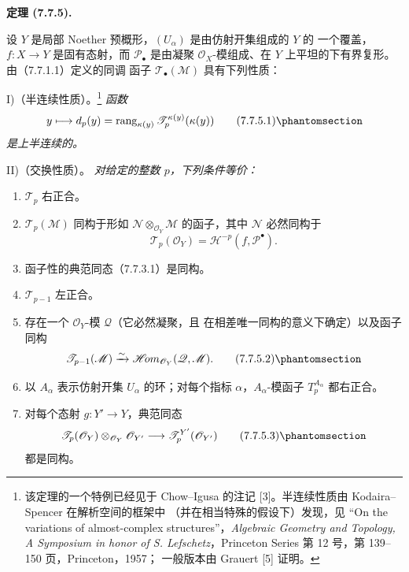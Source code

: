 \documentclass[UTF8,fontset=none,11pt,oneside,openany]{ctexbook}
\newenvironment{theorem}[1][]{%
  \par\medskip\noindent\textbf{定理 (#1).}\ %
}{\par}
\newcommand{\oldpage}[2][]{%
  \hypertarget{ega-source-page-#1-#2}{}%
  \marginnote{\scriptsize\textbf{#1}~|~#2}\ignorespaces}
\let\EGAOriginalLabel\label
\renewcommand{\label}[1]{\phantomsection\EGAOriginalLabel{#1}}
\begin{document}
\begin{theorem}[7.7.5]
设 $Y$ 是局部 Noether 预概形，$(U_\alpha)$ 是由仿射开集组成的 $Y$ 的
一个覆盖，$f:X\to Y$ 是固有态射，而 $\mathscr P_\bullet$ 是由凝聚
$\mathscr O_X$-模组成、在 $Y$ 上平坦的下有界复形。由（7.7.1.1）定义的同调
函子 $\mathscr T_\bullet(\mathscr M)$ 具有下列性质：

\medskip
\noindent
\textnormal{I)（半连续性质）。}\footnote{该定理的一个特例已经见于
Chow--Igusa 的注记 [3]。半连续性质由 Kodaira--Spencer 在解析空间的框架中
（并在相当特殊的假设下）发现，见 “On the variations of almost-complex
structures”，\emph{Algebraic Geometry and Topology, A Symposium in honor of
S. Lefschetz}，Princeton Series 第 12 号，第 139--150 页，Princeton，1957；
一般版本由 Grauert [5] 证明。}
\emph{函数}
\[
  y\longmapsto
  d_p(y)
  =
  \operatorname{rang}_{\kappa(y)}
    \mathscr T_p^{\kappa(y)}(\kappa(y))
  \tag{7.7.5.1}\label{III.7.7.5.1.fr}
\]
\emph{是上半连续的。}

\oldpage[III]{200}
\medskip
\noindent
\textnormal{II)（交换性质）。}
\emph{对给定的整数 $p$，下列条件等价：}
\begin{enumerate}
  \item[a)] $\mathscr T_p$ 右正合。

  \item[a$'$)] $\mathscr T_p(\mathscr M)$ 同构于形如
    $\mathscr N\otimes_{\mathscr O_Y}\mathscr M$ 的函子，其中 $\mathscr N$
    必然同构于
    \[
      \mathscr T_p(\mathscr O_Y)
      =
      \mathscr H^{-p}(f,\mathscr P^\bullet).
    \]

  \item[a$''$)] 函子性的典范同态（7.7.3.1）是同构。

  \item[b)] $\mathscr T_{p-1}$ 左正合。

  \item[b$'$)] 存在一个 $\mathscr O_Y$-模 $\mathscr Q$（它必然凝聚，且
    在相差唯一同构的意义下确定）以及函子同构
    \[
      \mathscr T_{p-1}(\mathscr M)
      \xrightarrow{\sim}
      \mathscr{H}\!om_{\mathscr O_Y}(\mathscr Q,\mathscr M).
      \tag{7.7.5.2}\label{III.7.7.5.2.fr}
    \]

  \item[c)] 以 $A_\alpha$ 表示仿射开集 $U_\alpha$ 的环；对每个指标
    $\alpha$，$A_\alpha$-模函子 $T_p^{A_\alpha}$ 都右正合。

  \item[d)] 对每个态射 $g:Y'\to Y$，典范同态
    \[
      \mathscr T_p(\mathscr O_Y)
      \otimes_{\mathscr O_Y}\mathscr O_{Y'}
      \longrightarrow
      \mathscr T_p^{Y'}(\mathscr O_{Y'})
      \tag{7.7.5.3}\label{III.7.7.5.3.fr}
    \]
    都是同构。
\end{enumerate}
\end{theorem}
\end{document}
